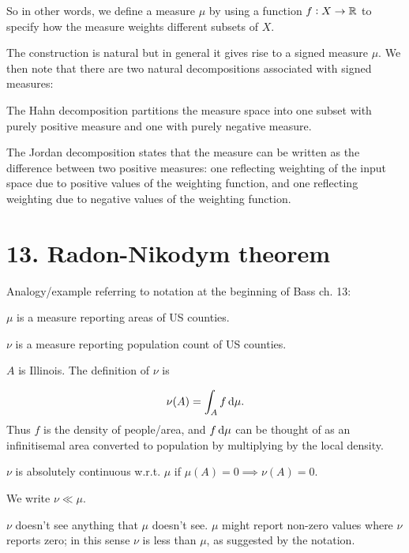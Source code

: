 \begin{intuition}
  So in other words, we define a measure $\mu$ by using a function $f:X \to \mathbb{R}$ to specify how the measure
  weights different subsets of $X$.

  The construction is natural but in general it gives rise to a signed measure $\mu$. We then note that there
  are two natural decompositions associated with signed measures:

  The Hahn decomposition partitions the measure space into one subset with purely positive measure
  and one with purely negative measure.

  The Jordan decomposition states that the measure can be written as the difference between two positive
  measures: one reflecting weighting of the input space due to positive values of the weighting function, and
  one reflecting weighting due to negative values of the weighting function.
\end{intuition}


\section{13. Radon-Nikodym theorem}

Analogy/example referring to notation at the beginning of Bass ch. 13:

$\mu$ is a measure reporting areas of US counties.

$\nu$ is a measure reporting population count of US counties.

$A$ is Illinois. The definition of $\nu$ is

\begin{align*}
  \nu(A) = \int_A f \d\mu.
\end{align*}
Thus $f$ is the density of people/area, and $f\d\mu$ can be thought of as an infinitisemal area
converted to population by multiplying by the local density.

\begin{definition}
  $\nu$ is absolutely continuous w.r.t. $\mu$ if $\mu(A) = 0 \implies \nu(A) = 0$.

  We write $\nu \ll \mu$.
\end{definition}

\begin{intuition}
  $\nu$ doesn't see anything that $\mu$ doesn't see​. $\mu$ might report non-zero values where
  $\nu$ reports zero; in this sense $\nu$ is less than $\mu$, as suggested by the notation.
\end{intuition}

